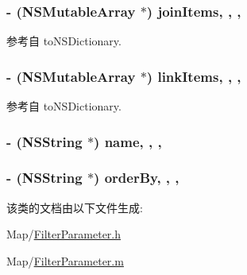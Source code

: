 \hypertarget{interface_filter_parameter_a63b04dc5f922c4d6a012933331a76149}{
\subsubsection[{join\-Items}]{\setlength{\rightskip}{0pt plus 5cm}-\/ (N\-S\-Mutable\-Array $\ast$) join\-Items\hspace{0.3cm}{\ttfamily [read]}, {\ttfamily [write]}, {\ttfamily [atomic]}, {\ttfamily [retain]}}}\label{interface_filter_parameter_a63b04dc5f922c4d6a012933331a76149}


参考自 to\-N\-S\-Dictionary.

\hypertarget{interface_filter_parameter_aa6ccb9ad285c9ac4c284a03115a834f5}{
\subsubsection[{link\-Items}]{\setlength{\rightskip}{0pt plus 5cm}-\/ (N\-S\-Mutable\-Array $\ast$) link\-Items\hspace{0.3cm}{\ttfamily [read]}, {\ttfamily [write]}, {\ttfamily [atomic]}, {\ttfamily [retain]}}}\label{interface_filter_parameter_aa6ccb9ad285c9ac4c284a03115a834f5}


参考自 to\-N\-S\-Dictionary.

\hypertarget{interface_filter_parameter_a32495fe4ce8013104c0433f3467ad743}{
\subsubsection[{name}]{\setlength{\rightskip}{0pt plus 5cm}-\/ (N\-S\-String $\ast$) name\hspace{0.3cm}{\ttfamily [read]}, {\ttfamily [write]}, {\ttfamily [atomic]}, {\ttfamily [copy]}}}\label{interface_filter_parameter_a32495fe4ce8013104c0433f3467ad743}
\hypertarget{interface_filter_parameter_a519e07fe4d3de6fef4514cd20c0eea2b}{
\subsubsection[{order\-By}]{\setlength{\rightskip}{0pt plus 5cm}-\/ (N\-S\-String $\ast$) order\-By\hspace{0.3cm}{\ttfamily [read]}, {\ttfamily [write]}, {\ttfamily [atomic]}, {\ttfamily [copy]}}}\label{interface_filter_parameter_a519e07fe4d3de6fef4514cd20c0eea2b}


该类的文档由以下文件生成\-:\begin{DoxyCompactItemize}
\item 
Map/\hyperlink{_filter_parameter_8h}{Filter\-Parameter.\-h}\item 
Map/\hyperlink{_filter_parameter_8m}{Filter\-Parameter.\-m}\end{DoxyCompactItemize}
